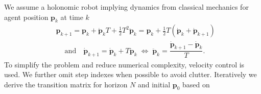 \documentclass[letterpaper,conference,10pt]{IEEEconf}
\begin{document}
We assume a holonomic robot implying dynamics from classical mechanics for agent position $\boldsymbol{p}_k$ at time $k$
\begin{align}
    \label{eq:dynamics}
    &\boldsymbol{p}_{k+1} = \boldsymbol{p}_k + \dot{\boldsymbol{p}}_kT + \frac{1}{2}T^2\ddot{\boldsymbol{p}}_k = \boldsymbol{p}_k + \frac{1}{2}T(\dot{\boldsymbol{p}}_k+\dot{\boldsymbol{p}}_{k+1})\\
    &\quad\: \text{and} \quad \dot{\boldsymbol{p}}_{k+1} = \dot{\boldsymbol{p}}_k+T\ddot{\boldsymbol{p}}_k \; \Leftrightarrow \; \ddot{\boldsymbol{p}}_k=\dfrac{\dot{\boldsymbol{p}}_{k+1}-\dot{\boldsymbol{p}}_k}{T}.\nonumber
\end{align}
To simplify the problem and reduce numerical complexity, velocity control is used. We further omit step indexes when possible to avoid clutter. Iteratively we derive the transition matrix for horizon $N$ and initial $\boldsymbol{p}_0$ based on 
\end{document}
